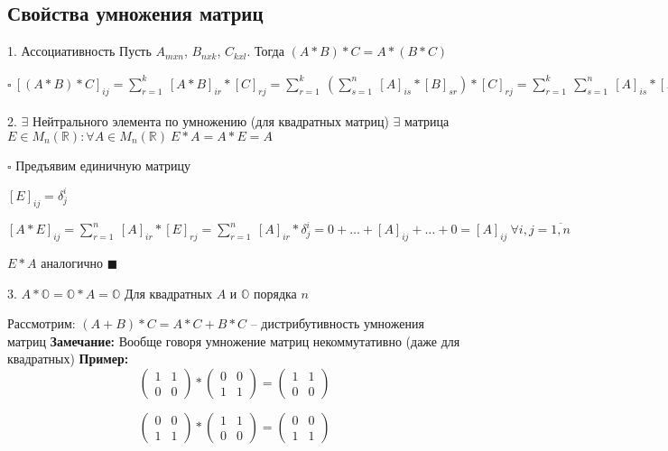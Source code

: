 \documentclass[a4paper,12pt]{article}
\begin{document}
	\subsection{Свойства умножения матриц}

	1. Ассоциативность
	Пусть $A_{mxn}$, $B_{nxk}$, $C_{kxl}$. Тогда $(A * B) * C = A * (B * C)$

	$\square~[(A * B) * C]_{ij} = \sum_{r=1}^k~[A * B]_{ir} * [C]_{rj} = \sum_{r=1}^{k}~(\sum_{s=1}^{n}~[A]_{is} * [B]_{sr}) * [C]_{rj} = \sum_{r=1}^{k}~\sum_{s=1}^{n}~[A]_{is} * [B]_{sr} * [C]_{rj} \underbrace{=}_\text{перегруппируем слагаемые} \sum_{s=1}^{n}~\sum_{r=1}^{k}~[A]_{is} * [B]_{sr} * [C]_{rj}=\sum_{s=1}^{n}~[A]_{is} * (\sum_{r=1}^{k}~[B]_{sr} * [C]_{rj})=\sum_{s=1}^{n}~[A]_{is} * [B * C]_{sj} \underbrace{=}_\text{по определению умножения}=A * (B * C)~\blacksquare$

	2. $\exists$ Нейтрального элемента по умножению (для квадратных матриц)
	$\exists$ матрица $E \in M_{n}(\mathbb R): \forall A \in M_{n}(\mathbb R)~E * A = A * E = A$

	$\square$ Предъявим единичную матрицу

	$[E]_{ij} = \delta_j^i$

	$[A * E]_{ij} = \sum_{r=1}^{n}~[A]_{ir} * [E]_{rj} = \sum_{r=1}^{n}~[A]_{ir} * \delta_j^i = 0 + \ldots + [A]_{ij} + \ldots + 0 = [A]_{ij}~\forall i, j = \overline{1,n}$

	$E * A$ аналогично $\blacksquare$

	3. $A * \mathbb O = \mathbb O * A = \mathbb O$
	Для квадратных $A$ и $\mathbb O$ порядка $n$

	Рассмотрим: $(A + B) * C = A * C + B * C$ -- дистрибутивность умножения матриц
	{\bf Замечание: } Вообще говоря умножение матриц некоммутативно (даже для квадратных)
	{\bf Пример: }
	\[
		\begin{pmatrix}
			1 & 1 \\
			0 & 0
		\end{pmatrix}
		*
		\begin{pmatrix}
			0 & 0 \\
			1 & 1
		\end{pmatrix}
		=
		\begin{pmatrix}
			1 & 1 \\
			0 & 0
		\end{pmatrix}
	\]

	\[
		\begin{pmatrix}
			0 & 0 \\
			1 & 1
		\end{pmatrix}
		*
		\begin{pmatrix}
			1 & 1 \\
			0 & 0
		\end{pmatrix}
		=
		\begin{pmatrix}
			0 & 0 \\
			1 & 1
		\end{pmatrix}
	\]
\end{document}
